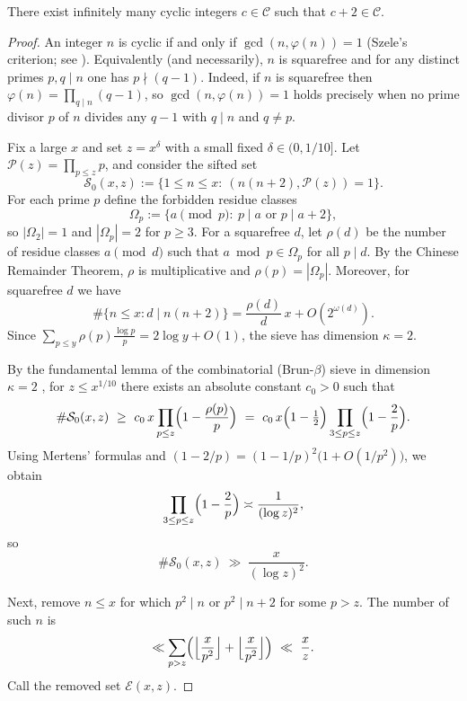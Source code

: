 \begin{theorem}\label{thm:twin_cyclics}
There exist infinitely many cyclic integers \(c\in\mathcal{C}\) such that \(c+2\in\mathcal{C}\).
\end{theorem}

\begin{proof}
An integer $n$ is cyclic if and only if $\gcd(n,\varphi(n))=1$ (Szele's criterion; see \cite{Szele1947}). Equivalently (and necessarily), $n$ is squarefree and for any distinct primes $p,q\mid n$ one has $p\nmid(q-1)$. Indeed, if $n$ is squarefree then $\varphi(n)=\prod_{q\mid n}(q-1)$, so $\gcd(n,\varphi(n))=1$ holds precisely when no prime divisor $p$ of $n$ divides any $q-1$ with $q\mid n$ and $q\ne p$.

Fix a large $x$ and set $z=x^{\delta}$ with a small fixed $\delta\in(0,1/10]$. Let $\mathcal P(z)=\prod_{p\le z}p$, and consider the sifted set
$$
\mathcal S_0(x,z):=\{1\le n\le x:\ (n(n+2),\mathcal P(z))=1\}.
$$
For each prime $p$ define the forbidden residue classes
$$
\Omega_p:=\{a\pmod p:\ p\mid a\text{ or }p\mid a+2\},
$$
so $|\Omega_2|=1$ and $|\Omega_p|=2$ for $p\ge3$. For a squarefree $d$, let $\rho(d)$ be the number of residue classes $a\pmod d$ such that $a\bmod p\in\Omega_p$ for all $p\mid d$. By the Chinese Remainder Theorem, $\rho$ is multiplicative and $\rho(p)=|\Omega_p|$. Moreover, for squarefree $d$ we have
$$
\#\{n\le x: d\mid n(n+2)\}=\frac{\rho(d)}{d}\,x+O(2^{\omega(d)}).
$$
Since $\sum_{p\le y}\rho(p)\frac{\log p}{p}=2\log y+O(1)$, the sieve has dimension $\kappa=2$.

By the fundamental lemma of the combinatorial (Brun-$\beta$) sieve in dimension $\kappa=2$ \cite{Greaves2001,IK2004}, for $z\le x^{1/10}$ there exists an absolute constant $c_0>0$ such that
$$
\#\mathcal S_0(x,z)\ \ge\ c_0\,x\prod_{p\le z}\Bigl(1-\frac{\rho(p)}{p}\Bigr)
\ =\ c_0\,x\Bigl(1-\tfrac12\Bigr)\prod_{3\le p\le z}\Bigl(1-\frac{2}{p}\Bigr).
$$
Using Mertens' formulas \cite{Apostol1976} and $(1-2/p)=(1-1/p)^2\bigl(1+O(1/p^2)\bigr)$, we obtain
$$
\prod_{3\le p\le z}\Bigl(1-\frac{2}{p}\Bigr)\asymp \frac{1}{(\log z)^2},
$$
so
$$
\#\mathcal S_0(x,z)\ \gg\ \frac{x}{(\log z)^2}.
$$

Next, remove $n\le x$ for which $p^2\mid n$ or $p^2\mid n+2$ for some $p>z$. The number of such $n$ is
$$
\ll \sum_{p>z}\Bigl(\Big\lfloor\frac{x}{p^2}\Big\rfloor+\Big\lfloor\frac{x}{p^2}\Big\rfloor\Bigr)\ \ll\ \frac{x}{z}.
$$
Call the removed set $\mathcal E(x,z)$.


\end{proof}
